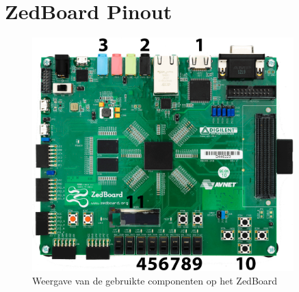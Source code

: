 \section{ZedBoard Pinout}
	
	\begin{figure}[H]
		\centering
		\includegraphics[width=0.9\textwidth]{Chapters/GlobaalSchema/Images/zedboard_large_transparent_nr.png}
		\caption{Weergave van de gebruikte componenten op het ZedBoard}
		\label{fig:zedboard_gebruikte_componenten}
	\end{figure}

